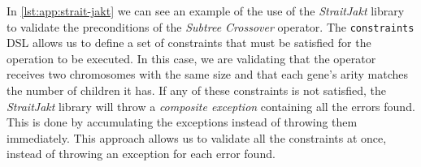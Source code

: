         In \vref{lst:app:strait-jakt} we can see an example of the use of the \textit{StraitJakt} library to validate 
        the preconditions of the \textit{Subtree Crossover} operator. The \texttt{constraints} DSL allows us to define a 
        set of constraints that must be satisfied for the operation to be executed. In this case, we are validating that 
        the operator receives two chromosomes with the same size and that each gene's arity matches the number of 
        children it has. If any of these constraints is not satisfied, the \textit{StraitJakt} library will throw a 
        \textit{composite exception} containing all the errors found. This is done by accumulating the exceptions
        instead of throwing them immediately. This approach allows us to validate all the constraints at once, instead
        of throwing an exception for each error found.
